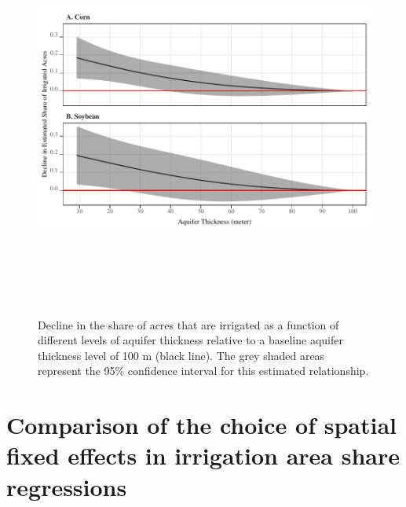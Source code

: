 \documentclass[
]{article}
\begin{document}
\begin{figure}[H]

{\centering \includegraphics[width=6.5in,height=500px,]{../../Figures/g_share_dif} 

}

\caption{Decline in the share of acres that are irrigated as a function of different levels of aquifer thickness relative to a baseline aquifer thickness level of 100 m (black line). The grey shaded areas represent the 95\% confidence interval for this estimated relationship.}\label{fig:test-sat-share}
\end{figure}

\clearpage

\hypertarget{county-fe}{%
\section{Comparison of the choice of spatial fixed effects in irrigation area share regressions}\label{county-fe}}

\setcounter{figure}{0}
\renewcommand{\thefigure}{C.\arabic{figure}}
\end{document}
